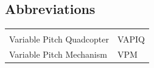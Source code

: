\documentclass{article}
\begin{document}
\vspace*{0.5 cm}
\begin{center}
\section*{\textbf{Abbreviations}}
\begin{tabular}{ll}
\rowcolor{cadetgrey}
    &   \\
Variable Pitch Quadcopter   & VAPIQ \\\rowcolor{gainsboro}
Variable Pitch Mechanism & VPM \\

\end{tabular}                                                             
\end{center}


\newpage


\tableofcontents
\listoffigures
\listoftables
\newpage













\end{document}

